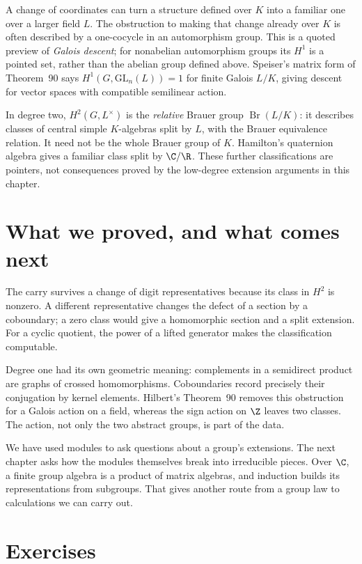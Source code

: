 \begin{beauty}
A change of coordinates can turn a structure defined over $K$ into a familiar one over a larger field $L$. The obstruction to making that change already over $K$ is often described by a one-cocycle in an automorphism group. This is a quoted preview of \emph{Galois descent}; for nonabelian automorphism groups its $H^1$ is a pointed set, rather than the abelian group defined above. Speiser's matrix form of Theorem~90 says $H^1(G,\mathrm{GL}_n(L))=1$ for finite Galois $L/K$, giving descent for vector spaces with compatible semilinear action.

In degree two, $H^2(G,L^\times)$ is the \emph{relative} Brauer group $\operatorname{Br}(L/K)$: it describes classes of central simple $K$-algebras split by $L$, with the Brauer equivalence relation. It need not be the whole Brauer group of $K$. Hamilton's quaternion algebra gives a familiar class split by $\C/\R$. These further classifications are pointers, not consequences proved by the low-degree extension arguments in this chapter.
\end{beauty}

\section{What we proved, and what comes next}

The carry survives a change of digit representatives because its class in $H^2$ is nonzero. A different representative changes the defect of a section by a coboundary; a zero class would give a homomorphic section and a split extension. For a cyclic quotient, the power of a lifted generator makes the classification computable.

Degree one had its own geometric meaning: complements in a semidirect product are graphs of crossed homomorphisms. Coboundaries record precisely their conjugation by kernel elements. Hilbert's Theorem~90 removes this obstruction for a Galois action on a field, whereas the sign action on $\Z$ leaves two classes. The action, not only the two abstract groups, is part of the data.

We have used modules to ask questions about a group's extensions. The next chapter asks how the modules themselves break into irreducible pieces. Over $\C$, a finite group algebra is a product of matrix algebras, and induction builds its representations from subgroups. That gives another route from a group law to calculations we can carry out.

\section{Exercises}

